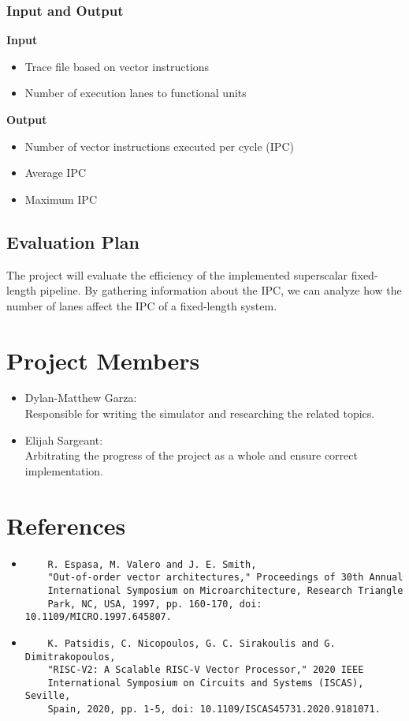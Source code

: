 \documentclass[12pt]{article}
\begin{document}
\subsubsection{Input and Output}
\textbf{Input}
\begin{itemize}
    \item Trace file based on vector instructions 
    \item Number of execution lanes to functional units
\end{itemize}
\textbf{Output}
\begin{itemize}
    \item Number of vector instructions executed per cycle (IPC)
    \item Average IPC
    \item Maximum IPC
\end{itemize}
\subsection{Evaluation Plan}
The project will evaluate the efficiency of the implemented superscalar fixed-length pipeline. By
gathering information about the IPC, we can analyze how the number of lanes affect the IPC
of a fixed-length system. 
\section{Project Members}
\begin{itemize}
    \item Dylan-Matthew Garza:\\
        Responsible for writing the simulator and researching the related
        topics.
    \item Elijah Sargeant:\\
        Arbitrating the progress of the project as a whole and ensure correct
        implementation.
\end{itemize}
\section{References}

\begin{itemize}
    \item 
    \begin{verbatim}
    R. Espasa, M. Valero and J. E. Smith, 
    "Out-of-order vector architectures," Proceedings of 30th Annual 
    International Symposium on Microarchitecture, Research Triangle 
    Park, NC, USA, 1997, pp. 160-170, doi: 10.1109/MICRO.1997.645807.
    \end{verbatim}
    \item \begin{verbatim}
    K. Patsidis, C. Nicopoulos, G. C. Sirakoulis and G. Dimitrakopoulos, 
    "RISC-V2: A Scalable RISC-V Vector Processor," 2020 IEEE 
    International Symposium on Circuits and Systems (ISCAS), Seville, 
    Spain, 2020, pp. 1-5, doi: 10.1109/ISCAS45731.2020.9181071.
    \end{verbatim}
\end{itemize}
\end{document}
